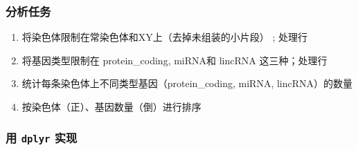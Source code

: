 \documentclass[
]{article}
\begin{document}
\hypertarget{ux5206ux6790ux4efbux52a1}{%
\subsubsection{分析任务}\label{ux5206ux6790ux4efbux52a1}}

\begin{enumerate}
\def\labelenumi{\arabic{enumi}.}
\item
  将染色体限制在常染色体和XY上（去掉未组装的小片段） ; 处理行
\item
  将基因类型限制在 protein\_coding, miRNA和 lincRNA 这三种；处理行
\item
  统计每条染色体上不同类型基因（protein\_coding, miRNA, lincRNA）的数量
\item
  按染色体（正）、基因数量（倒）进行排序
\end{enumerate}

\hypertarget{ux7528-dplyr-ux5b9eux73b0}{%
\subsubsection{\texorpdfstring{用 \texttt{dplyr}
实现}{用 dplyr 实现}}\label{ux7528-dplyr-ux5b9eux73b0}}
\end{document}
